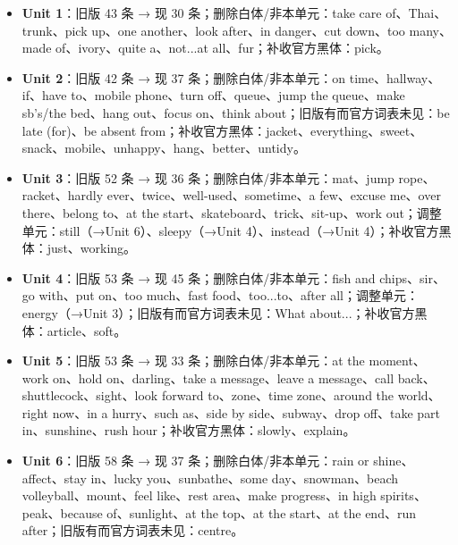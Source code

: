 \documentclass[UTF8,a4paper,11pt,oneside]{ctexbook}
\begin{document}
\par\addvspace{0.75em}\par
\vspace{0.12em}\noindent{\color{rulelight}\rule{\linewidth}{0.55pt}}\par
\addvspace{0.2em}
\begin{itemize}[leftmargin=2.2em,itemsep=0.25ex,topsep=0.3ex,label={\textcolor{mainblue}{\small\textbullet}}]
\item \textbf{\textcolor{mainblue}{Unit 1}}：旧版 43 条 → 现 30 条；删除白体/非本单元：take care of、Thai、trunk、pick up、one another、look after、in danger、cut down、too many、made of、ivory、quite a、not...at all、fur；补收官方黑体：pick。
\item \textbf{\textcolor{mainblue}{Unit 2}}：旧版 42 条 → 现 37 条；删除白体/非本单元：on time、hallway、if、have to、mobile phone、turn off、queue、jump the queue、make sb's/the bed、hang out、focus on、think about；旧版有而官方词表未见：be late (for)、be absent from；补收官方黑体：jacket、everything、sweet、snack、mobile、unhappy、hang、better、untidy。
\item \textbf{\textcolor{mainblue}{Unit 3}}：旧版 52 条 → 现 36 条；删除白体/非本单元：mat、jump rope、racket、hardly ever、twice、well-used、sometime、a few、excuse me、over there、belong to、at the start、skateboard、trick、sit-up、work out；调整单元：still（→Unit 6）、sleepy（→Unit 4）、instead（→Unit 4）；补收官方黑体：just、working。
\item \textbf{\textcolor{mainblue}{Unit 4}}：旧版 53 条 → 现 45 条；删除白体/非本单元：fish and chips、sir、go with、put on、too much、fast food、too...to、after all；调整单元：energy（→Unit 3）；旧版有而官方词表未见：What about...；补收官方黑体：article、soft。
\item \textbf{\textcolor{mainblue}{Unit 5}}：旧版 53 条 → 现 33 条；删除白体/非本单元：at the moment、work on、hold on、darling、take a message、leave a message、call back、shuttlecock、sight、look forward to、zone、time zone、around the world、right now、in a hurry、such as、side by side、subway、drop off、take part in、sunshine、rush hour；补收官方黑体：slowly、explain。
\item \textbf{\textcolor{mainblue}{Unit 6}}：旧版 58 条 → 现 37 条；删除白体/非本单元：rain or shine、affect、stay in、lucky you、sunbathe、some day、snowman、beach volleyball、mount、feel like、rest area、make progress、in high spirits、peak、because of、sunlight、at the top、at the start、at the end、run after；旧版有而官方词表未见：centre。

\end{itemize}
\end{document}

